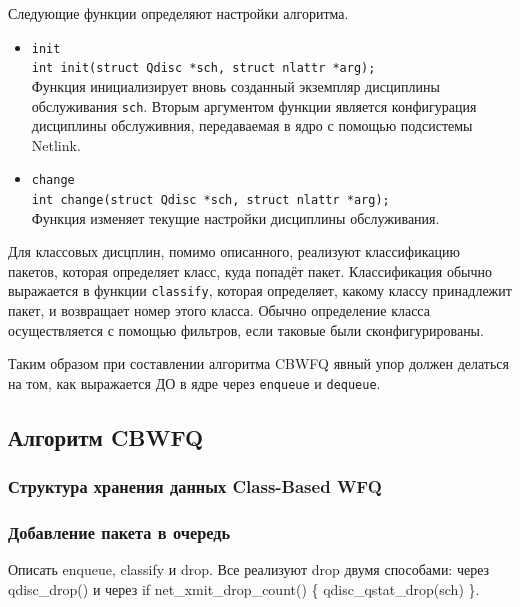 	Следующие функции определяют настройки алгоритма.
	\begin{itemize}
		\item \lstinline{init}\\
			  \lstinline{int init(struct Qdisc *sch, struct nlattr *arg);}\\
			  Функция инициализирует вновь созданный экземпляр дисциплины обслуживания \texttt{sch}.
			  Вторым аргументом функции является конфигурация дисциплины обслуживния, передаваемая
			  в ядро с помощью подсистемы Netlink.
		\item \lstinline{change}\\
			  \lstinline{int change(struct Qdisc *sch, struct nlattr *arg);}\\
			  Функция изменяет текущие настройки дисциплины обслуживания. 
	\end{itemize}

	Для классовых дисцплин, помимо описанного, реализуют классификацию пакетов, которая
	определяет класс, куда попадёт пакет. Классификация обычно выражается в функции \lstinline{classify},
	которая определяет, какому классу принадлежит пакет, и возвращает номер этого класса.
	Обычно определение класса осуществляется с помощью фильтров, если таковые были сконфигурированы.

	Таким образом при составлении алгоритма CBWFQ явный упор должен делаться на том, как выражается
	ДО в ядре через \lstinline{enqueue} и \lstinline{dequeue}.

	\subsection{Алгоритм CBWFQ}
	
		\subsubsection{Структура хранения данных Class-Based WFQ}

		\subsubsection{Добавление пакета в очередь}

			Описать enqueue, classify и drop. Все реализуют drop двумя способами: через qdisc\_drop() и через
			if net\_xmit\_drop\_count() \{ qdisc\_qstat\_drop(sch) \}. 

